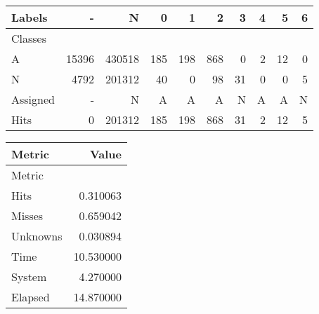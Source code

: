 \begin{tabular}{l|r|r|r|r|r|r|r|r|r}

Labels &      - &       N &    0 &    1 &    2 &   3 &  4 &   5 &  6 \\\hline
Classes  &        &         &      &      &      &     &    &     &    \\\hline
\hline
A        &  15396 &  430518 &  185 &  198 &  868 &   0 &  2 &  12 &  0 \\\hline
N        &   4792 &  201312 &   40 &    0 &   98 &  31 &  0 &   0 &  5 \\\hline
\hline
Assigned &      - &       N &    A &    A &    A &   N &  A &   A &  N \\\hline
Hits     &      0 &  201312 &  185 &  198 &  868 &  31 &  2 &  12 &  5 
\end{tabular}
\begin{tabular}{l|r}

Metric   &      Value \\\hline
Metric   &            \\\hline
\hline
Hits     &   0.310063 \\\hline
Misses   &   0.659042 \\\hline
Unknowns &   0.030894 \\\hline
Time     &  10.530000 \\\hline
System   &   4.270000 \\\hline
Elapsed  &  14.870000 
\end{tabular}
